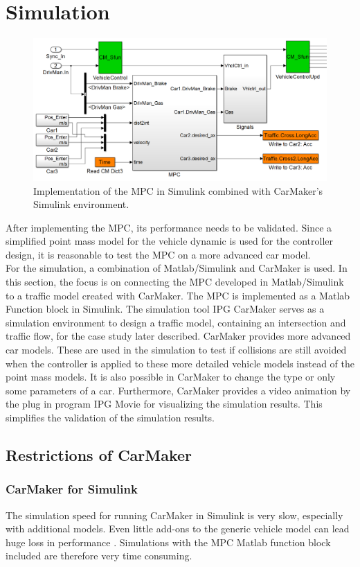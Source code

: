 \documentclass[letterpaper,10pt,conference]{ieeeconf}
\begin{document}
\section{Simulation} \label{sec:simulation}
\begin{figure}[]
    \centering
    \includegraphics[width=1.8\columnwidth]{CarMaker_Implement2.png}
    \caption{Implementation of the MPC in Simulink combined with CarMaker's Simulink environment.}
    \label{fig:CM_Implement}
\end{figure}
After implementing the MPC, its performance needs to be validated. Since a simplified point mass model for the vehicle dynamic is used for the controller design, it is reasonable to test the MPC on a more advanced car model.\\ \indent
For the simulation, a combination of Matlab/Simulink and CarMaker is used. In this section, the focus is on connecting the MPC developed in Matlab/Simulink to a traffic model created with CarMaker. The MPC is implemented as a Matlab Function block in Simulink. The simulation tool IPG CarMaker serves as a simulation environment to design a traffic model, containing an intersection and traffic flow, for the case study later described. CarMaker provides more advanced car models. These are used in the simulation to test if collisions are still avoided when the controller is applied to these more detailed vehicle models instead of the point mass models. It is also possible in CarMaker to change the type or only some parameters of a car. Furthermore, CarMaker provides a video animation by the plug in program IPG Movie for visualizing the simulation results. This simplifies the validation of the simulation results.
\subsection{Restrictions of CarMaker}
\subsubsection{CarMaker for Simulink}
The simulation speed for running CarMaker in Simulink is very slow, especially with additional models. Even little add-ons to the generic vehicle model can lead huge loss in performance \cite{qsguide}. Simulations with the MPC Matlab function block included are therefore very time consuming.
\end{document}
